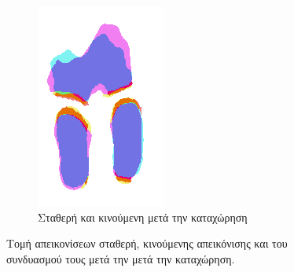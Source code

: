 \documentclass[a4paper,12pt]{article}
\begin{document}
\begin{figure}[H]
    \begin{subfigure}[t]{0.4\linewidth}
    \includegraphics[width=\linewidth]{combination_label_after_registration_2.png}
    \caption{Σταθερή και κινούμενη μετά την καταχώρηση}
    \end{subfigure}

    \caption{Τομή απεικονίσεων σταθερή, κινούμενης απεικόνισης και του
             συνδυασμού τους μετά την μετά την καταχώρηση.}
    \label{fig:registration_after:2}
\end{figure}
\end{document}
